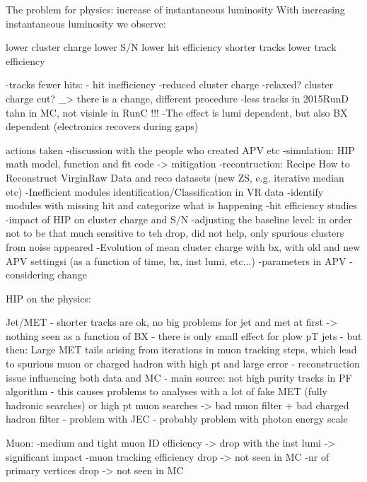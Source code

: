 The problem for physics:
increase of instantaneous luminosity
 With increasing instantaneous luminosity we observe:

    lower cluster charge
    lower S/N
    lower hit efficiency
    shorter tracks
    lower track efficiency 

-tracks fewer hits:
- hit inefficiency
-reduced cluster charge
-relaxed? cluster charge cut? _> there is a change, different procedure
-less tracks in  2015RunD tahn in MC, not visinle in RunC  !!!
-The effect is lumi dependent, but also BX dependent (electronics recovers during gaps)


actions taken
-discussion with the people who created APV etc
-simulation: HIP math model, function and fit code -> mitigation
-recontruction: Recipe How to Reconstruct VirginRaw Data and reco datasets (new ZS, e.g. iterative median etc)
-Inefficient modules identification/Classification in VR data -identify modules with missing hit and categorize what is happening
-hit efficiency studies
-impact of HIP on cluster charge and S/N 
-adjusting the baseline level: in order not to be that much sensitive to teh drop, did not help, only spurious clusters from noise appeared
-Evolution of mean cluster charge with bx, with old and new APV settingsi (as a function of time, bx, inst lumi, etc...)
-parameters in APV - considering change

HIP on the physics:

Jet/MET
- shorter tracks are ok, no big problems for jet and met at first -> nothing seen as a function of BX
- there is only small effect for plow pT jets
- but then: Large MET tails arising from iterations in muon tracking steps, which lead to spurious muon or charged hadron with high pt and large error
	- reconstruction issue influencing both data and MC
	- main source: not high purity tracks in PF algorithm
	- this causes problems to analyses with a lot of fake MET (fully hadronic searches) or high pt muon searches
	-> bad muon filter + bad charged hadron filter    
- problem with JEC - probably problem with photon energy scale

Muon:
-medium and tight muon ID efficiency -> drop with the inst lumi -> significant impact
-muon tracking efficiency drop -> not seen in MC
-nr of primary vertices drop -> not seen in MC

